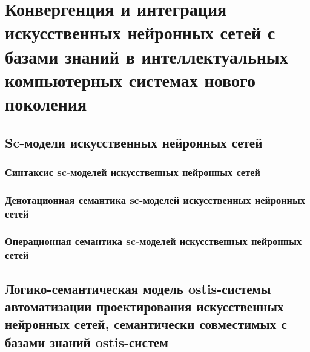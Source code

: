 \chapter{Конвергенция и интеграция искусственных нейронных сетей с базами знаний в интеллектуальных компьютерных системах нового поколения}
\label{chapter_ann}


\section{Sc-модели искусственных нейронных сетей}
\subsection{Синтаксис sc-моделей искусственных нейронных сетей}
\subsection{Денотационная семантика sc-моделей искусственных нейронных сетей}
\subsection{Операционная семантика sc-моделей искусственных нейронных сетей}
\section{Логико-семантическая модель ostis-системы автоматизации проектирования искусственных нейронных сетей, семантически совместимых с базами знаний ostis-систем}

%